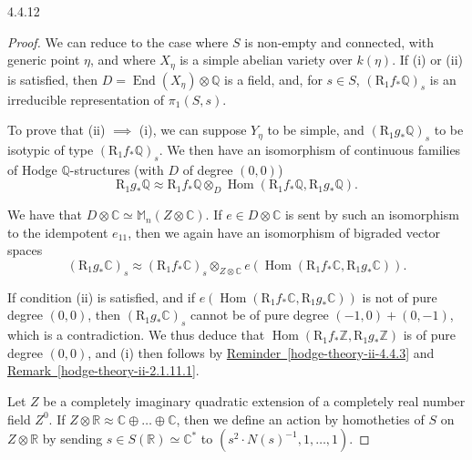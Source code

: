 \begin{proposition}{4.4.12}
\begin{enumerate}
    \end{enumerate}\begin{proof}\par{}We can reduce to the case where \(S\) is non-empty and connected, with generic point \(\eta \), and where \(X_\eta \) is a simple abelian variety over \(k(\eta )\).
      If (i) or (ii) is satisfied, then \(D=\operatorname {End}(X_\eta )\otimes \mathbb {Q}\) is a field, and, for \(s\in  S\), \((\mathrm {R}_1f_*\mathbb {Q})_s\) is an irreducible representation of \(\pi _1(S,s)\).\par{}To prove that (ii) \(\implies \) (i), we can suppose \(Y_\eta \) to be simple, and \((\mathrm {R}_1g_*\mathbb {Q})_s\) to be isotypic of type \((\mathrm {R}_1f_*\mathbb {Q})_s\).
      We then have an isomorphism of continuous families of Hodge \(\mathbb {Q}\)-structures (with \(D\) of degree \((0,0)\))
      \[         \mathrm {R}_1g_*\mathbb {Q}         \approx  \mathrm {R}_1f_*\mathbb {Q}\otimes _D\operatorname {Hom}(\mathrm {R}_1f_*\mathbb {Q},\mathrm {R}_1g_*\mathbb {Q}).       \]\par{}We have that \(D\otimes \mathbb {C}\simeq \mathbb {M}_n(Z\otimes \mathbb {C})\).
      If \(e\in  D\otimes \mathbb {C}\) is sent by such an isomorphism to the idempotent \(e_{11}\), then we again have an isomorphism of bigraded vector spaces
      \[         (\mathrm {R}_1g_*\mathbb {C})_s         \approx  (\mathrm {R}_1f_*\mathbb {C})_s\otimes _{Z\otimes \mathbb {C}}e(\operatorname {Hom}(\mathrm {R}_1f_*\mathbb {C},\mathrm {R}_1g_*\mathbb {C})).       \]\par{}If condition (ii) is satisfied, and if \(e(\operatorname {Hom}(\mathrm {R}_1f_*\mathbb {C},\mathrm {R}_1g_*\mathbb {C}))\) is not of pure degree \((0,0)\), then \((\mathrm {R}_1g_*\mathbb {C})_s\) cannot be of pure degree \((-1,0)+(0,-1)\), which is a contradiction.
      We thus deduce that \(\operatorname {Hom}(\mathrm {R}_1f_*\mathbb {Z},\mathrm {R}_1g_*\mathbb {Z})\) is of pure degree \((0,0)\), and (i) then follows by \hyperref[hodge-theory-ii-4.4.3]{Reminder~\ref*{hodge-theory-ii-4.4.3}} and \hyperref[hodge-theory-ii-2.1.11.1]{Remark~\ref*{hodge-theory-ii-2.1.11.1}}.\par{}Let \(Z\) be a completely imaginary quadratic extension of a completely real number field \(Z^0\).
      If \(Z\otimes \mathbb {R}\approx \mathbb {C}\oplus \ldots \oplus \mathbb {C}\), then we define an action by homotheties of \(S\) on \(Z\otimes \mathbb {R}\) by sending \(s\in  S(\mathbb {R})\simeq \mathbb {C}^*\) to \((s^2\cdot  N(s)^{-1},1,\ldots ,1)\).

\end{proof}
\end{proposition}
